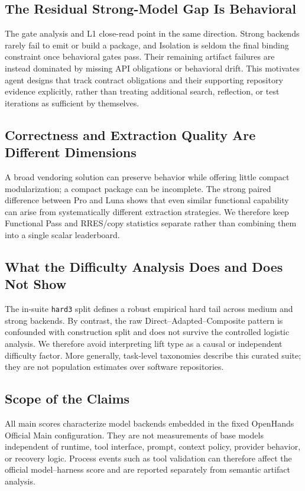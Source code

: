 \documentclass[acmsmall,screen,review,anonymous]{acmart}
\begin{document}
\subsection{The Residual Strong-Model Gap Is Behavioral}

The gate analysis and L1 close-read point in the same direction. Strong backends
rarely fail to emit or build a package, and Isolation is seldom the final binding
constraint once behavioral gates pass. Their remaining artifact failures are
instead dominated by missing API obligations or behavioral drift. This motivates
agent designs that track contract obligations and their supporting repository
evidence explicitly, rather than treating additional search, reflection, or test
iterations as sufficient by themselves.

\subsection{Correctness and Extraction Quality Are Different Dimensions}

A broad vendoring solution can preserve behavior while offering little compact
modularization; a compact package can be incomplete. The strong paired difference
between Pro and Luna shows that even similar functional capability can arise from
systematically different extraction strategies. We therefore keep Functional Pass
and RRES/copy statistics separate rather than combining them into a single scalar
leaderboard.

\subsection{What the Difficulty Analysis Does and Does Not Show}

The in-suite \texttt{hard3} split defines a robust empirical hard tail across
medium and strong backends. By contrast, the raw Direct--Adapted--Composite pattern
is confounded with construction split and does not survive the controlled logistic
analysis. We therefore avoid interpreting lift type as a causal or independent
difficulty factor. More generally, task-level taxonomies describe this curated
suite; they are not population estimates over software repositories.

\subsection{Scope of the Claims}

All main scores characterize model backends embedded in the fixed OpenHands
Official Main configuration. They are not measurements of base models independent
of runtime, tool interface, prompt, context policy, provider behavior, or recovery
logic. Process events such as tool validation can therefore affect the official
model--harness score and are reported separately from semantic artifact analysis.
\end{document}
